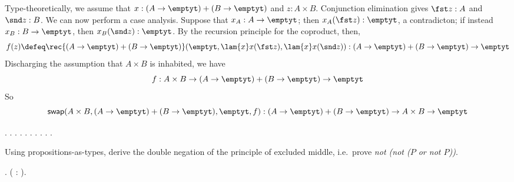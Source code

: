 Type-theoretically, we assume that $x : (A \to\emptyt) + (B \to\emptyt)$ and $z
: A \times B$.  Conjunction elimination gives $\fst z : A$ and $\snd z : B$.
We can now perform a case analysis.  Suppose that $x_{A} : A \to \emptyt$; then
$x_{A}(\fst z) : \emptyt$, a contradicton; if instead $x_{B} : B \to \emptyt$,
then $x_{B}(\snd z) : \emptyt$.  By the recursion principle for the coproduct,
then,
\[
f(z) \defeq \rec{(A\to\emptyt)+(B\to\emptyt)}(
\emptyt,
\lam{x}x(\fst z),
\lam{x}x(\snd z)
)
:
(A \to \emptyt) + (B \to \emptyt) \to \emptyt
\]
Discharging the assumption that $A \times B$ is inhabited, we have
\[
f : 
A \times B \to (A \to \emptyt) + (B \to \emptyt) \to \emptyt
\]
So
\[
\mathsf{swap}(A\times B, (A\to\emptyt)+(B\to\emptyt), \emptyt, f)
:
(A \to \emptyt) + (B \to \emptyt) 
\to 
A \times B 
\to \emptyt
\] \begin{coqdoccode}
\coqdocindent{1.00em}
 \coqdocnotation{\ensuremath{\lnot}}   \coqdocnotation{\ensuremath{\lnot}}   \coqdocnotation{\ensuremath{\lnot}} \coqdocnotation{(}  \coqdocnotation{)}.\coqdoceol
\coqdocindent{1.00em}
.\coqdoceol
\coqdocindent{2.00em}
 .\coqdoceol
\coqdocindent{2.00em}
  .\coqdoceol
\coqdocindent{2.00em}
 .\coqdoceol
\coqdocindent{2.00em}
 .\coqdoceol
\coqdocindent{2.00em}
.\coqdoceol
\coqdocindent{2.00em}
 .\coqdoceol
\coqdocindent{1.00em}
.\coqdoceol
\coqdocemptyline
\coqdocnoindent
{} .\coqdoceol
\coqdocemptyline
\end{coqdoccode}
Using propositions-as-types, derive the double negation of the
principle of excluded middle, i.e.~prove 
\emph{not (not ($P$ or not $P$))}. \begin{coqdoccode}
\coqdocemptyline
\coqdocnoindent
{} .\coqdoceol
\coqdocindent{1.00em}
 ( : ).\coqdoceol
\coqdocemptyline
\end{coqdoccode}


